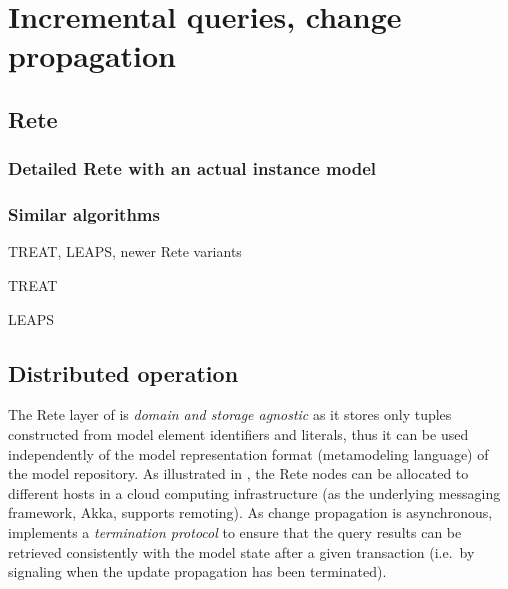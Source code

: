 \section{Incremental queries, change propagation}
\label{sec:incrementality}



\subsection{Rete}




\subsubsection{Detailed Rete with an actual instance model}





\subsubsection{Similar algorithms}

TREAT, LEAPS, newer Rete variants

TREAT \cite{Miranker:1991:OPT:627280.627434} 

LEAPS \cite{Batory:1994:LA:899216}



\subsection{Distributed operation}


The Rete layer of \iqd{} is \emph{domain and storage agnostic} as it stores only tuples constructed from model element identifiers and literals, thus it can be used independently of the model representation format (metamodeling language) of the model repository.
As illustrated in , the Rete nodes can be allocated to different hosts in a cloud computing infrastructure (as the underlying messaging framework, Akka, supports remoting). As change propagation is asynchronous, \iqd{} implements a \emph{termination protocol} to ensure that the query results can be retrieved consistently with the model state after a given transaction (i.e.\ by signaling when the update propagation has been terminated).


